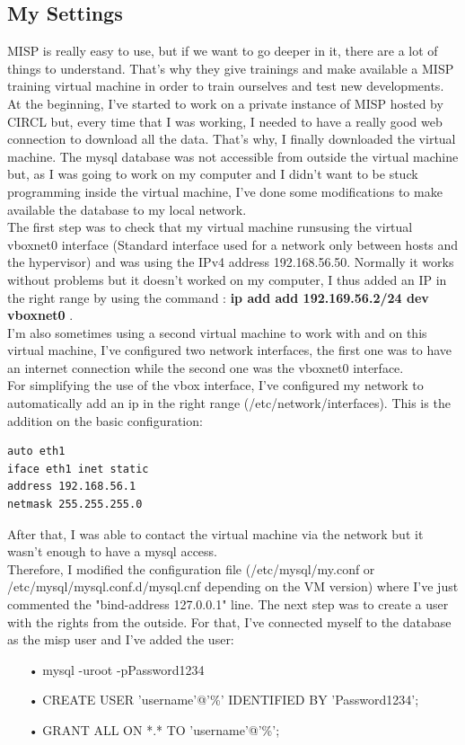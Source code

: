 \documentclass{eplmastersthesis}
\begin{document}
\subsection{My Settings}

MISP is really easy to use, but if we want to go deeper in it, there are a lot of things to understand. That's why they give trainings and make available a MISP training virtual machine in order to train ourselves and test new developments.\\
At the beginning, I've started to work on a private instance of MISP hosted by CIRCL but, every time that I was working, I needed to have a really good web connection to download all the data. That's why, I finally downloaded the virtual machine. 
The mysql database was not accessible from outside the virtual machine but, as I was going to work on my computer and I didn't want to be stuck programming inside the virtual machine, I've done some modifications to make available the database to my local network.\\
The first step was to check that my virtual machine runsusing the virtual vboxnet0 interface (Standard interface used for a network only between hosts and the hypervisor) and was using the IPv4 address 192.168.56.50. Normally it works without problems but it doesn't worked on my computer, I thus added an IP in the right range by using the command :
\textbf{ip add add 192.169.56.2/24 dev vboxnet0} .\\
I'm also sometimes using a second virtual machine to work with and on this virtual machine, I've configured two network interfaces, the first one was to have an internet connection while the second one was the vboxnet0 interface.\\
For simplifying the use of the vbox interface, I've configured my network to automatically add an ip in the right range (/etc/network/interfaces). This is the addition on the basic configuration:
\begin{verbatim}
auto eth1
iface eth1 inet static
address 192.168.56.1
netmask 255.255.255.0
\end{verbatim}
 
After that, I was able to contact the virtual machine via the network but it wasn't enough to have a mysql access. \\
Therefore, I modified the configuration file (/etc/mysql/my.conf or /etc/mysql/mysql.conf.d/mysql.cnf depending on the VM version) where I've just commented the "bind-address 127.0.0.1" line.
The next step was to create a user with the rights from the outside. For that, I've connected myself to the database as the misp user and I've added the user:
\begin{itemize}
\item[•] mysql -uroot -pPassword1234 
\item[•] CREATE USER 'username'@'\%' IDENTIFIED BY 'Password1234';
\item[•] GRANT ALL ON *.* TO 'username'@'\%';
\end{itemize}
\end{document}
